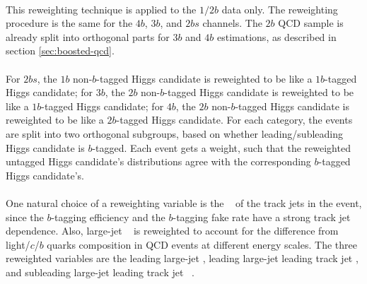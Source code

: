\paragraph{}
This reweighting technique is applied to the $1/2b$ data only. 
The reweighting procedure is the same for the $4b$, $3b$, and $2bs$ channels. 
The $2b$ QCD sample is already split into orthogonal parts for $3b$ and $4b$ estimations, as described in section \ref{sec:boosted-qcd}.

\paragraph{}
For $2bs$, the $1b$ non-$b$-tagged Higgs candidate is reweighted to be like a $1b$-tagged Higgs candidate; for $3b$, the $2b$ non-$b$-tagged Higgs candidate is reweighted to be like a $1b$-tagged Higgs candidate; for $4b$, the $2b$ non-$b$-tagged Higgs candidate is reweighted to be like a $2b$-tagged Higgs candidate.
For each category, the events are split into two orthogonal subgroups, based on whether leading/subleading Higgs candidate is $b$-tagged.
Each event gets a weight, such that the reweighted untagged Higgs candidate's distributions agree with the corresponding $b$-tagged Higgs candidate's.

\paragraph{}
One natural choice of a reweighting variable is the \pt~ of the track jets in the event, since the $b$-tagging efficiency and the $b$-tagging fake rate have a strong track jet \pt~ dependence. 
Also, large-\R jet \pt~ is reweighted to account for the difference from light/$c$/$b$ quarks composition in QCD events at different energy scales.
The three reweighted variables are the leading large-\R jet \pt, leading large-\R jet leading track jet \pt, and subleading large-\R jet leading track jet \pt~.

